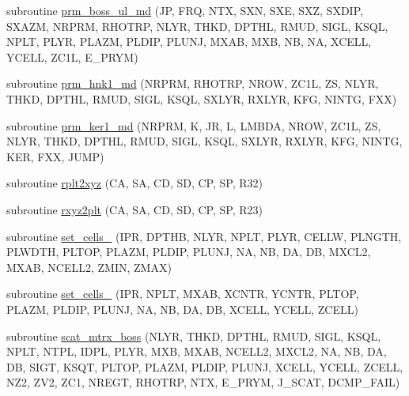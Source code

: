 \begin{DoxyCompactItemize}
\item 
subroutine \hyperlink{Leroi_8f90_ab6689c64fba851d3db437dbd7fc0d13a}{prm\+\_\+boss\+\_\+ul\+\_\+md} (JP, F\+RQ, N\+TX, S\+XN, S\+XE, S\+XZ, S\+X\+D\+IP, S\+X\+A\+ZM, N\+R\+P\+RM, R\+H\+O\+T\+RP, N\+L\+YR, T\+H\+KD, D\+P\+T\+HL, R\+M\+UD, S\+I\+GL, K\+S\+QL, N\+P\+LT, P\+L\+YR, P\+L\+A\+ZM, P\+L\+D\+IP, P\+L\+U\+NJ, M\+X\+AB, M\+XB, NB, NA, X\+C\+E\+LL, Y\+C\+E\+LL, Z\+C1L, E\+\_\+\+P\+R\+YM)
\item 
subroutine \hyperlink{Leroi_8f90_a90b2b96ee9e9153503bfd5d5bf7d1d0e}{prm\+\_\+hnk1\+\_\+md} (N\+R\+P\+RM, R\+H\+O\+T\+RP, N\+R\+OW, Z\+C1L, ZS, N\+L\+YR, T\+H\+KD, D\+P\+T\+HL, R\+M\+UD, S\+I\+GL, K\+S\+QL, S\+X\+L\+YR, R\+X\+L\+YR, K\+FG, N\+I\+N\+TG, F\+XX)
\item 
subroutine \hyperlink{Leroi_8f90_a3a9566c86f1c0b93bae5a6117621feae}{prm\+\_\+ker1\+\_\+md} (N\+R\+P\+RM, K, JR, L, L\+M\+B\+DA, N\+R\+OW, Z\+C1L, ZS, N\+L\+YR, T\+H\+KD, D\+P\+T\+HL, R\+M\+UD, S\+I\+GL, K\+S\+QL, S\+X\+L\+YR, R\+X\+L\+YR, K\+FG, N\+I\+N\+TG, K\+ER, F\+XX, J\+U\+MP)
\item 
subroutine \hyperlink{Leroi_8f90_a8ec0c93946d1a3d78ce1cabd3de6558d}{rplt2xyz} (CA, SA, CD, SD, CP, SP, R32)
\item 
subroutine \hyperlink{Leroi_8f90_af139b1e21e0c1e77a354000840adee66}{rxyz2plt} (CA, SA, CD, SD, CP, SP, R23)
\item 
subroutine \hyperlink{Leroi_8f90_a34542cb94b24b37bf99b63f2e3e5e368}{set\+\_\+cells\+\_} (I\+PR, D\+P\+T\+HB, N\+L\+YR, N\+P\+LT, P\+L\+YR, C\+E\+L\+LW, P\+L\+N\+G\+TH, P\+L\+W\+D\+TH, P\+L\+T\+OP, P\+L\+A\+ZM, P\+L\+D\+IP, P\+L\+U\+NJ, NA, NB, DA, DB, M\+X\+C\+L2, M\+X\+AB, N\+C\+E\+L\+L2, Z\+M\+IN, Z\+M\+AX)
\item 
subroutine \hyperlink{Leroi_8f90_a14cc0157cbf2d5d8c0af6167028061cf}{set\+\_\+cells\+\_} (I\+PR, N\+P\+LT, M\+X\+AB, X\+C\+N\+TR, Y\+C\+N\+TR, P\+L\+T\+OP, P\+L\+A\+ZM, P\+L\+D\+IP, P\+L\+U\+NJ, NA, NB, DA, DB, X\+C\+E\+LL, Y\+C\+E\+LL, Z\+C\+E\+LL)
\item 
subroutine \hyperlink{Leroi_8f90_ace4eaf8c1fdfc5cad3e2a93e77642139}{scat\+\_\+mtrx\+\_\+boss} (N\+L\+YR, T\+H\+KD, D\+P\+T\+HL, R\+M\+UD, S\+I\+GL, K\+S\+QL, N\+P\+LT, N\+T\+PL, I\+D\+PL, P\+L\+YR, M\+XB, M\+X\+AB, N\+C\+E\+L\+L2, M\+X\+C\+L2, NA, NB, DA, DB, S\+I\+GT, K\+S\+QT, P\+L\+T\+OP, P\+L\+A\+ZM, P\+L\+D\+IP, P\+L\+U\+NJ, X\+C\+E\+LL, Y\+C\+E\+LL, Z\+C\+E\+LL, N\+Z2, Z\+V2, Z\+C1, N\+R\+E\+GT, R\+H\+O\+T\+RP, N\+TX, E\+\_\+\+P\+R\+YM, J\+\_\+\+S\+C\+AT, D\+C\+M\+P\+\_\+\+F\+A\+IL)
\item 

\end{DoxyCompactItemize}
